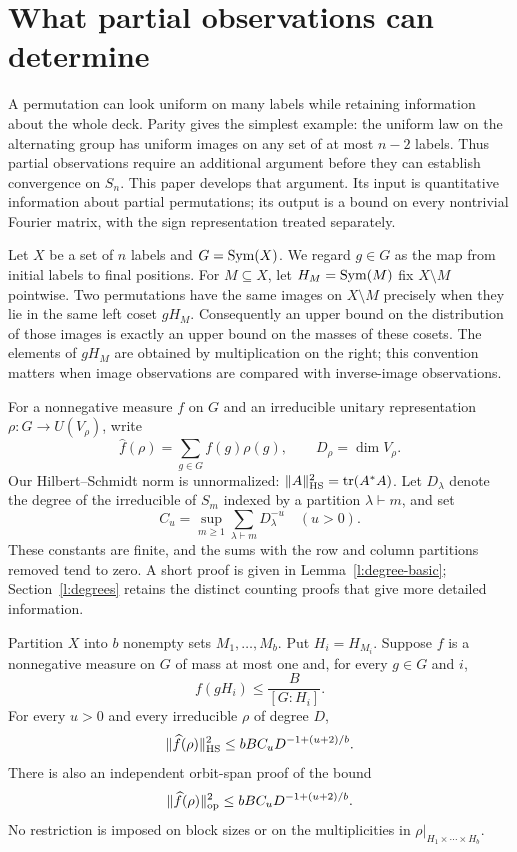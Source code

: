 \section{What partial observations can determine}
\label{l:introduction}

A permutation can look uniform on many labels while retaining information about the whole deck. Parity gives the simplest example: the uniform law on the alternating group has uniform images on any set of at most $n-2$ labels. Thus partial observations require an additional argument before they can establish convergence on $S_n$. This paper develops that argument. Its input is quantitative information about partial permutations; its output is a bound on every nontrivial Fourier matrix, with the sign representation treated separately.

Let $X$ be a set of $n$ labels and $G=\operatorname{Sym}(X)$. We regard $g\in G$ as the map from initial labels to final positions. For $M\subseteq X$, let $H_M=\operatorname{Sym}(M)$ fix $X\setminus M$ pointwise. Two permutations have the same images on $X\setminus M$ precisely when they lie in the same left coset $gH_M$. Consequently an upper bound on the distribution of those images is exactly an upper bound on the masses of these cosets. The elements of $gH_M$ are obtained by multiplication on the right; this convention matters when image observations are compared with inverse-image observations.

For a nonnegative measure $f$ on $G$ and an irreducible unitary representation $\rho:G\to U(V_\rho)$, write
\[
 \widehat f(\rho)=\sum_{g\in G}f(g)\rho(g),\qquad D_\rho=\dim V_\rho.
\]
Our Hilbert--Schmidt norm is unnormalized: $\|A\|_{\mathrm{HS}}^2=\operatorname{tr}(A^*A)$. Let $D_\lambda$ denote the degree of the irreducible of $S_m$ indexed by a partition $\lambda\vdash m$, and set
\[
 C_u=\sup_{m\ge1}\sum_{\lambda\vdash m}D_\lambda^{-u}\quad(u>0).
\]
These constants are finite, and the sums with the row and column partitions removed tend to zero. A short proof is given in Lemma~\ref{l:degree-basic}; Section~\ref{l:degrees} retains the distinct counting proofs that give more detailed information.

\begin{theorem}
\label{l:main}
Partition $X$ into $b$ nonempty sets $M_1,\ldots,M_b$. Put $H_i=H_{M_i}$. Suppose $f$ is a nonnegative measure on $G$ of mass at most one and, for every $g\in G$ and $i$,
\begin{equation}\label{l:main-cap}
 f(gH_i)\le \frac{B}{[G:H_i]}.
\end{equation}
For every $u>0$ and every irreducible $\rho$ of degree $D$,
\begin{equation}\label{l:main-hs}
 \|\widehat f(\rho)\|_{\mathrm{HS}}^2
 \le bBC_uD^{-1+(u+2)/b}.
\end{equation}
There is also an independent orbit-span proof of the bound
\begin{equation}\label{l:main-orbit}
 \|\widehat f(\rho)\|_{\mathrm{op}}^2
 \le bBC_uD^{-1+(u+2)/b}.
\end{equation}
No restriction is imposed on block sizes or on the multiplicities in $\rho|_{H_1\times\cdots\times H_b}$.
\end{theorem}

